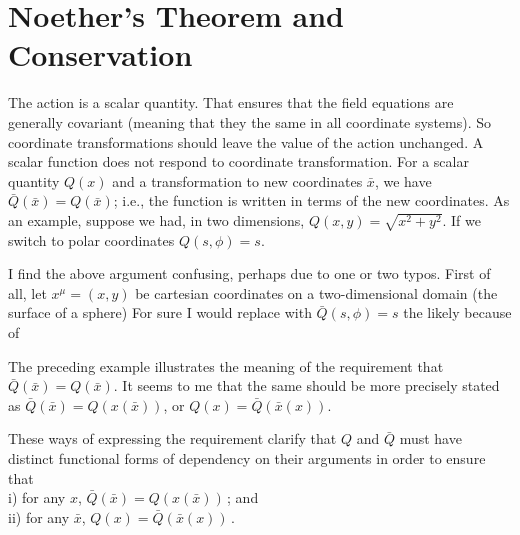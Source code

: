 \section{Noether's Theorem and Conservation}\label{sec:JFrank_CFT_3.3}
The action is a scalar quantity. That ensures that the field equations are generally covariant (meaning that they  the same in all coordinate systems). So coordinate transformations should leave the value of the action unchanged. A scalar function does not respond to coordinate transformation. For a scalar quantity $Q(x)$ and a transformation to new coordinates $\bar{x}$, we have $\bar{Q}(\bar{x}) = Q(\bar{x})$; i.e., the function is written in terms of the new coordinates. As an example, suppose we had, in two dimensions, 
$Q(x, y) = \sqrt{x^2 + y^2}$. If we switch to polar coordinates $Q(s, \phi) = s$. 

\parindent=0pt  %
\parbox{\textwidth}{\begin{mdframed}[style=MyFrame] %
I find the above argument confusing, perhaps due to one or two typos. First of all, let $x^\mu = (x,y)$ be cartesian coordinates on a two-dimensional domain (the surface of a sphere)  For sure I would replace 
 with $\bar{Q}(s, \phi) = s$ the likely because of 

The preceding example illustrates the meaning of the requirement that $\bar{Q}(\bar{x}) = Q(\bar{x})$. It seems to me that the same should be more precisely stated as 
$\bar{Q}(\bar{x}) = Q(x(\bar{x}))$, or $Q(x) = \bar{Q}(\bar{x}(x))$. 

These ways of expressing the requirement clarify that $Q$ and $\bar{Q}$ must have distinct functional forms of dependency on their arguments in order to ensure that\\ i) for any $x$, $\bar{Q}(\bar{x}) = Q(x(\bar{x}))\,$; and \\
ii) for any $\bar{x}$, $Q(x) = \bar{Q}(\bar{x}(x))\,$. 
\end{mdframed}} %
\parindent=10pt %


